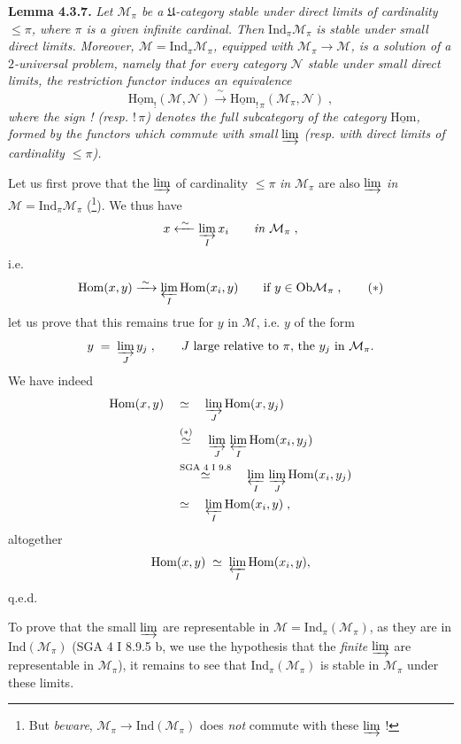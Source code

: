 \documentclass[11pt]{article}
\newcommand{\printedpage}[1]{\marginpar{\footnotesize p.~#1}}
\newcommand{\msp}[1]{\marginpar{\footnotesize [#1]}}
\newcommand{\uHom}{\underline{\mathrm{Hom}}}
\newcommand{\Ind}{\mathrm{Ind}}
\newcommand{\Hom}{\mathrm{Hom}}
\newcommand{\Ob}{\mathrm{Ob}}
\begin{document}
\textbf{Lemma 4.3.7.} \textit{Let $\mathcal{M}_\pi$ be a $\mathfrak{U}$-category stable under direct limits of cardinality $\leqslant \pi$, where $\pi$ is a given infinite cardinal. Then} $\Ind_\pi\mathcal{M}_\pi$ \textit{is stable under small direct limits. Moreover, $\mathcal{M} = \Ind_\pi\mathcal{M}_\pi$, equipped with $\mathcal{M}_\pi \longrightarrow \mathcal{M}$, is a solution of a $2$-universal problem, namely
\printedpage{15}
that for every category $\mathcal{N}$ stable under small direct limits, the restriction functor induces an equivalence}
\[
\uHom_{!}(\mathcal{M},\mathcal{N}) \xrightarrow{\;\sim\;} \uHom_{!\,\pi}(\mathcal{M}_\pi,\mathcal{N}) \;, \tag*{(4.3.7.1)}
\]
\textit{where the sign ! (resp. $!\,\pi$) denotes the full subcategory of the category} $\uHom$\textit{, formed by the functors which commute with small} $\varinjlim$ \textit{(resp. with direct limits of cardinality $\leqslant \pi$).}

\msp{page 78}
Let us first prove that the $\varinjlim$ of cardinality $\leqslant \pi$ \textit{in} $\mathcal{M}_\pi$ are also $\varinjlim$ \textit{in} $\mathcal{M} = \Ind_\pi\mathcal{M}_\pi$ (\footnote{But \textit{beware}, $\mathcal{M}_\pi \longrightarrow \Ind(\mathcal{M}_\pi)$ does \textit{not} commute with these $\varinjlim$ !}). We thus have
\[
x \xleftarrow{\;\sim\;} \varinjlim_{I} x_i \qquad \textit{in } \mathcal{M}_\pi \;,
\]
i.e.
\[
\Hom(x,y) \xrightarrow{\;\sim\;} \varprojlim_{I} \Hom(x_i,y) \qquad \text{if } y \in \Ob\mathcal{M}_\pi \;, \tag*{$(*)$}
\]
let us prove that this remains true for $y$ in $\mathcal{M}$, i.e. $y$ of the form
\[
y \;=\; \varinjlim_{J} y_j \;, \qquad J \text{ large relative to } \pi\text{, the } y_j \text{ in } \mathcal{M}_\pi.
\]
We have indeed
\[
\begin{aligned}
\Hom(x,y) \quad &\simeq \quad \varinjlim_{J} \Hom(x,y_j)\\
&\overset{(*)}{\simeq} \quad \varinjlim_{J}\, \varprojlim_{I} \Hom(x_i,y_j)\\
&\overset{\text{SGA 4 I 9.8}}{\simeq} \quad \varprojlim_{I}\, \varinjlim_{J} \Hom(x_i,y_j)\\
&\simeq \quad \varprojlim_{I} \Hom(x_i,y) \;,
\end{aligned}
\]
altogether
\[
\Hom(x,y) \;\simeq\; \varprojlim_{I} \Hom(x_i,y),
\]
q.e.d.

To prove that the small $\varinjlim$ are representable in $\mathcal{M} = \Ind_\pi(\mathcal{M}_\pi)$, as they are in $\Ind(\mathcal{M}_\pi)$ (SGA 4 I 8.9.5 b, we use the hypothesis that the \textit{finite} $\varinjlim$ are representable in $\mathcal{M}_\pi$), it remains to see that $\Ind_\pi(\mathcal{M}_\pi)$ is stable in $\mathcal{M}_\pi$ under these limits.
\end{document}
